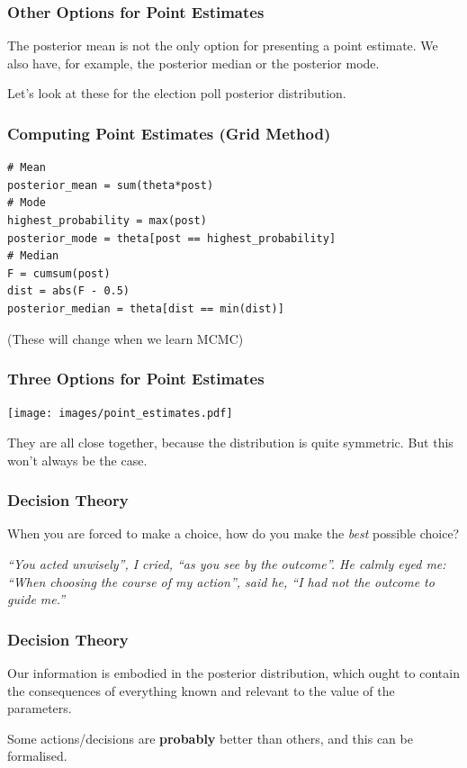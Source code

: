 \documentclass{beamer}
\begin{document}
\begin{frame}
\frametitle{Other Options for Point Estimates}
The posterior mean is not the only option for presenting a point estimate.
We also have, for example, the posterior median or the posterior mode.\\[0.5em]\pause

Let's look at these for the election poll posterior distribution.
\end{frame}

\begin{frame}[fragile]
\frametitle{Computing Point Estimates (Grid Method)}

\begin{verbatim}
# Mean
posterior_mean = sum(theta*post)
# Mode
highest_probability = max(post)
posterior_mode = theta[post == highest_probability]
# Median
F = cumsum(post)
dist = abs(F - 0.5)
posterior_median = theta[dist == min(dist)]
\end{verbatim}
(These will change when we learn MCMC)

\end{frame}



\begin{frame}
\frametitle{Three Options for Point Estimates}
\begin{center}
\texttt{[image: images/point\_estimates.pdf]}
\end{center}

They are all close together, because the distribution is quite symmetric.
But this won't always be the case.

\end{frame}



\begin{frame}
\frametitle{Decision Theory}
When you are forced to make a choice, how do you make the {\em best} possible
choice?\\[0.7em]
\pause

{\em 
``You acted unwisely'', I cried, ``as you see
by the outcome''. He calmly eyed me:
``When choosing the course of my action'', said he, ``I had
not the outcome to guide me.''
}

\end{frame}


\begin{frame}
\frametitle{Decision Theory}
Our information is embodied in the posterior distribution,
which ought to contain the consequences of everything
known and relevant to the value of the parameters.
\pause

Some actions/decisions are {\bf probably} better than others,
and this can be formalised.
\end{frame}
\end{document}
